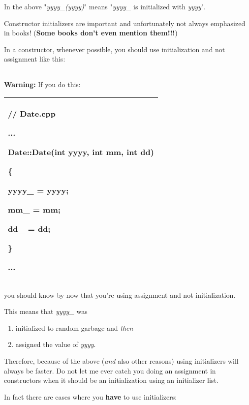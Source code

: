 \documentclass[
]{article}
\providecommand{\tightlist}{%
  \setlength{\itemsep}{0pt}\setlength{\parskip}{0pt}}
\begin{document}
In the above "\emph{yyyy\_(yyyy)}" means "\emph{yyyy\_} is initialized
with \emph{yyyy}".

Constructor initializers are important and unfortunately not always
emphasized in books! (\textbf{Some books don't even mention them!!!})

In a constructor, whenever possible, you should use initialization and
not assignment like this:

\begin{longtable}[]{@{}@{}}
\toprule
\endhead
\bottomrule
\end{longtable}

\textbf{Warning: }If you do this:

\begin{longtable}[]{@{}l@{}}
\toprule
\endhead
\begin{minipage}[t]{0.97\columnwidth}\raggedright
// Date.cpp

...

Date::Date(int yyyy, int mm, int dd)

\{

yyyy\_ = yyyy;

mm\_ = mm;

dd\_ = dd;

\}

...\strut
\end{minipage}\tabularnewline
\bottomrule
\end{longtable}

you should know by now that you're using assignment and not
initialization.

This means that \emph{yyyy\_} was

\begin{enumerate}
\def\labelenumi{\arabic{enumi}.}
\tightlist
\item
  initialized to random garbage and \emph{then}
\item
  assigned the value of \emph{yyyy}.
\end{enumerate}

Therefore, because of the above (\emph{and} also other reasons) using
initializers will always be faster. Do not let me ever catch you doing
an assignment in constructors when it should be an initialization using
an initializer list.

In fact there are cases where you \textbf{have} to use initializers:

\begin{longtable}[]{@{}@{}}
\toprule
\endhead
\bottomrule
\end{longtable}
\end{document}
